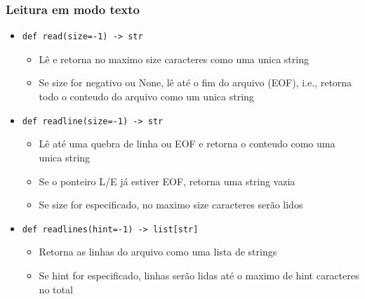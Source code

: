 \documentclass[12pt]{article}
\begin{document}
            \subsubsection{Leitura em modo texto}
            \begin{itemize}
                \item \verb|def read(size=-1) -> str|
                \begin{itemize}
                    \item Lê e retorna no maximo size caracteres como uma unica 
                    string
                    \item Se size for negativo ou None, lê até o fim do arquivo 
                    (EOF), i.e., retorna todo o conteudo do arquivo como um 
                    unica string
                \end{itemize}
                \item \verb|def readline(size=-1) -> str|
                \begin{itemize}
                    \item Lê até uma quebra de linha ou EOF e retorna o conteudo 
                    como uma unica string
                    \item Se o ponteiro L/E já estiver EOF, retorna uma string 
                    vazia
                    \item Se size for especificado, no maximo size caracteres 
                    serão lidos
                \end{itemize}
                \item \verb|def readlines(hint=-1) -> list[str]|
                \begin{itemize}
                    \item Retorna as linhas do arquivo como uma lista de strings
                    \item Se hint for especificado, linhas serão lidas até o 
                    maximo de hint caracteres no total
                \end{itemize}
            \end{itemize}
\end{document}
